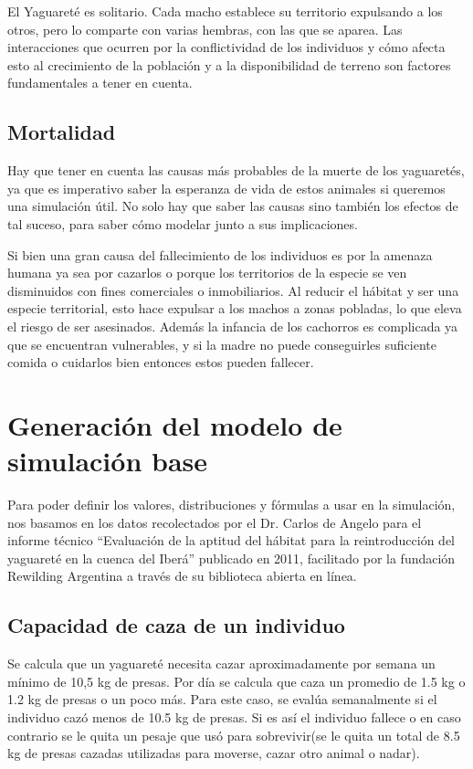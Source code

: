     El Yaguareté es solitario. Cada macho establece su territorio expulsando a los otros, pero lo comparte con varias hembras, con las que se aparea. Las interacciones que ocurren por la conflictividad de los individuos y cómo afecta esto al crecimiento de la población y a la disponibilidad de terreno son factores fundamentales a tener en cuenta.
    
    \subsection{Mortalidad}
    Hay que tener en cuenta las causas más probables de la muerte de los yaguaretés, ya que es imperativo saber la esperanza de vida de estos animales si queremos una simulación útil. No solo hay que saber las causas sino también los efectos de tal suceso, para saber cómo modelar junto a sus implicaciones.
    
    Si bien una gran causa del fallecimiento de los individuos es por la amenaza humana ya sea por cazarlos o porque los territorios de la especie se ven disminuidos con fines comerciales o inmobiliarios. Al reducir el hábitat y ser una especie territorial, esto hace expulsar a los machos a zonas pobladas, lo que eleva el riesgo de ser asesinados.
    Además la infancia de los cachorros es complicada ya que se encuentran vulnerables, y si la madre no puede conseguirles suficiente comida o cuidarlos bien entonces estos pueden fallecer.

\section{Generación del modelo de simulación base}

    Para poder definir los valores, distribuciones y fórmulas a usar en la simulación, nos basamos en los datos
    recolectados por el Dr. Carlos de Angelo para el informe técnico ``Evaluación de la aptitud del hábitat para la
    reintroducción del yaguareté en la cuenca del Iberá'' publicado en 2011, facilitado por la fundación Rewilding
    Argentina a través de su biblioteca abierta en línea.

    \subsection{Capacidad de caza de un individuo}
    Se calcula que un yaguareté necesita cazar aproximadamente por semana un mínimo de 10,5 kg de presas. Por día se calcula que caza un promedio de 1.5 kg o 1.2 kg de presas o un poco más. Para este caso, se evalúa semanalmente si el individuo cazó menos de 10.5 kg de presas. Si es así el individuo fallece o en caso contrario se le quita un pesaje que usó para sobrevivir(se le quita un total de 8.5 kg de presas cazadas utilizadas para moverse, cazar otro animal o nadar).
    
